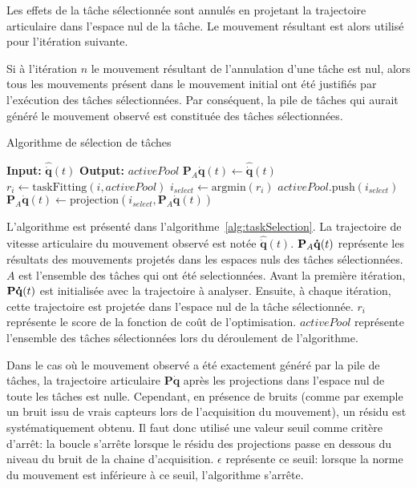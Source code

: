 Les effets de la t\^ache sélectionnée sont annulés en projetant la trajectoire
articulaire dans l'espace nul de la t\^ache. Le mouvement résultant est alors utilisé
pour l'itération suivante.

Si à l'itération $n$ le mouvement résultant de l'annulation d'une t\^ache est nul, alors
tous les mouvements présent dans le mouvement initial ont été justifiés 
par l'exécution des t\^aches sélectionnées. Par conséquent,
la pile de t\^aches qui aurait généré le mouvement observé
est constituée des t\^aches sélectionnées.
\newcommand{\shOUTPUT}{\textbf{Output: }}
\newcommand{\shINPUT}{\textbf{Input: }}

\begin{algorithm}[t]
  \caption{Algorithme de sélection de t\^aches}
  \label{alg:taskSelection}
\begin{algorithmic}[1]
  \STATE \shINPUT $\mathbf{\hat{\dot{q}}}(t)$
\STATE \shOUTPUT $activePool$
\STATE $\mathbf{P}_A\mathbf{\dot{q}}(t)\gets \mathbf{\hat{\dot{q}}}(t)$
    \STATE $r_i \gets \mathrm{taskFitting}(i, activePool)$
  \ENDFOR
  \STATE $i_{select} \gets \mathrm{argmin}(r_i)$
  \STATE $activePool.\mathrm{push}(i_{select})$
  \STATE $\mathbf{P}_A\mathbf{\dot{q}}(t) \gets \mathrm{projection}(i_{select}, \mathbf{P}_A\mathbf{\dot{q}}(t))$
\ENDWHILE
\end{algorithmic}
\end{algorithm}
L'algorithme est présenté dans l'algorithme~\ref{alg:taskSelection}.
La trajectoire de vitesse articulaire du mouvement observé est notée
$\mathbf{\hat{\dot{q}}}(t)$.
${\mathbf{P}}_A{\mathbf{\dot{q}}}(t)$ représente les résultats des mouvements projetés dans les espaces nuls des t\^aches
sélectionnées. $A$ est l'ensemble des t\^aches qui ont été selectionnées.
Avant la première itération, ${\mathbf{P\dot{q}}}(t)$ est initialisée avec la trajectoire  
à analyser. Ensuite, à chaque itération, cette trajectoire est projetée
dans l'espace nul de la t\^ache sélectionnée.
$r_i$ représente le score de la fonction de coût de l'optimisation. $activePool$ représente
l'ensemble des t\^aches sélectionnées lors du déroulement de l'algorithme. 

Dans le cas où le mouvement observé a été exactement
généré par la pile de t\^aches, la trajectoire articulaire $\mathbf{P\dot{q}}$ après les
projections dans l'espace nul de toute les t\^aches est nulle.
Cependant, en présence de bruits (comme par exemple un bruit issu 
de vrais capteurs lors de l'acquisition du mouvement),
un résidu est systématiquement obtenu. Il faut donc utilisé une valeur
seuil comme critère d'arrêt: la boucle s'arrête lorsque le résidu
des projections passe en dessous du niveau du bruit de la chaine d'acquisition.
$\epsilon$ représente ce seuil: lorsque la norme du mouvement
est inférieure à ce seuil, l'algorithme s'arrête.

